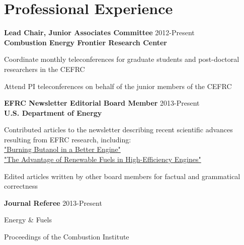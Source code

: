 \section{Professional Experience}
\begin{lonelist}
   \item[] \textbf{Lead Chair, Junior Associates Committee} \hfill
           2012-Present\\
           \textbf{Combustion Energy Frontier Research Center}
   \begin{innerlist}
      \item Coordinate monthly teleconferences for graduate students
            and post-doctoral researchers in the CEFRC
      \item Attend PI teleconferences on behalf of the junior members
           of the CEFRC
   \end{innerlist}

   \item[] \textbf{EFRC Newsletter Editorial Board Member} \hfill 2013-Present\\
           \textbf{U.S. Department of Energy}
   \begin{innerlist}
       \item Contributed articles to the newsletter describing recent
             scientific advances resulting from EFRC research,
             including:\\
             \href{http://www.energyfrontier.us/newsletter/201210/burning-butanol-better-engine}
             {"Burning Butanol in a Better Engine"}\\
             \href{http://www.energyfrontier.us/newsletter/201401/advantage-renewable-fuels-high-efficiency-engines}
             {"The Advantage of Renewable Fuels in High-Efficiency Engines"}
       \item Edited articles written by other board members for factual
             and grammatical correctness
   \end{innerlist}

   \item[] \textbf{Journal Referee} \hfill 2013-Present
   \begin{innerlist}
       \item Energy \& Fuels
       \item Proceedings of the Combustion Institute
   \end{innerlist}

\end{lonelist}

